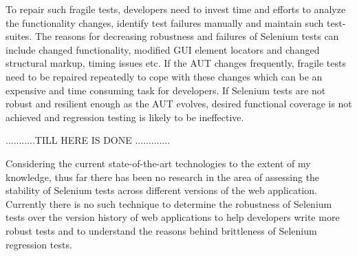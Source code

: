 To repair such fragile tests, developers need to invest time and efforts to analyze the functionality changes, identify test failures manually and maintain such test-suites. The reasons for decreasing robustness and failures of Selenium tests can include changed functionality, modified GUI element locators and changed structural markup, timing issues etc. If the AUT changes frequently, fragile tests need to be repaired repeatedly to cope with these changes which can be an expensive and time consuming task for developers. If Selenium tests are not robust and resilient enough as the AUT evolves, desired functional coverage is not achieved and regression testing is likely to be ineffective.


...........TILL HERE IS DONE .............

Considering the current state-of-the-art technologies to the extent of my knowledge, thus far there has been no research in the area of assessing the stability of Selenium tests across different versions of the web application. Currently there is no such technique to determine the robustness of Selenium tests over the version history of web applications to help developers write more robust tests and to understand the reasons behind brittleness of Selenium regression tests. 


